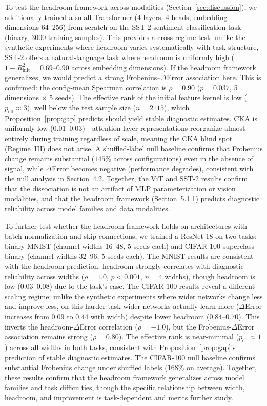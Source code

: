 \documentclass[twoside,11pt]{article}
\begin{document}
To test the headroom framework across modalities (Section~\ref{sec:discussion}), we additionally trained a small Transformer (4 layers, 4 heads, embedding dimensions 64--256) from scratch on the SST-2 sentiment classification task (binary, 3000 training samples). This provides a cross-regime test: unlike the synthetic experiments where headroom varies systematically with task structure, SST-2 offers a natural-language task where headroom is uniformly high ($1-R^2_{\text{init}} = 0.69$--$0.90$ across embedding dimensions). If the headroom framework generalizes, we would predict a strong Frobenius--$\Delta$Error association here. This is confirmed: the config-mean Spearman correlation is $\rho=0.90$ ($p=0.037$, 5 dimensions $\times$ 5 seeds). The effective rank of the initial feature kernel is low ($p_{\text{eff}} \approx 3$), well below the test sample size ($n=2115$), which Proposition~\ref{prop:gap} predicts should yield stable diagnostic estimates. CKA is uniformly low ($0.01$--$0.03$)---attention-layer representations reorganize almost entirely during training regardless of scale, meaning the CKA blind spot (Regime~III) does not arise. A shuffled-label null baseline confirms that Frobenius change remains substantial ($145\%$ across configurations) even in the absence of signal, while $\Delta$Error becomes negative (performance degrades), consistent with the null analysis in Section~4.2. Together, the ViT and SST-2 results confirm that the dissociation is not an artifact of MLP parameterization or vision modalities, and that the headroom framework (Section~5.1.1) predicts diagnostic reliability across model families and data modalities.

To further test whether the headroom framework holds on architectures with batch normalization and skip connections, we trained a ResNet-18 on two tasks: binary MNIST (channel widths 16--48, 5 seeds each) and CIFAR-100 superclass binary (channel widths 32--96, 5 seeds each). The MNIST results are consistent with the headroom prediction: headroom strongly correlates with diagnostic reliability across widths ($\rho=1.0$, $p<0.001$, $n=4$ widths), though headroom is low ($0.03$--$0.08$) due to the task's ease. The CIFAR-100 results reveal a different scaling regime: unlike the synthetic experiments where wider networks change less and improve less, on this harder task wider networks actually learn more ($\Delta$Error increases from $0.09$ to $0.44$ with width) despite lower headroom ($0.84$--$0.70$). This inverts the headroom-$\Delta$Error correlation ($\rho=-1.0$), but the Frobenius-$\Delta$Error association remains strong ($\rho=0.80$). The effective rank is near-minimal ($p_{\text{eff}} \approx 1$) across all widths in both tasks, consistent with Proposition~\ref{prop:gap}'s prediction of stable diagnostic estimates. The CIFAR-100 null baseline confirms substantial Frobenius change under shuffled labels ($168\%$ on average). Together, these results confirm that the headroom framework generalizes across model families and task difficulties, though the specific relationship between width, headroom, and improvement is task-dependent and merits further study.
\end{document}
